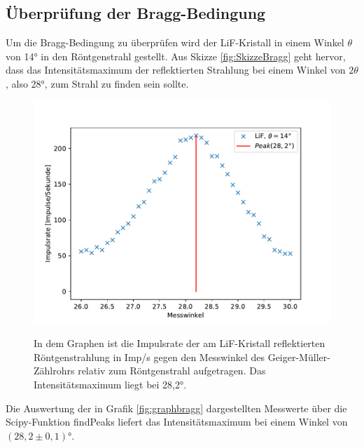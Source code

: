 \documentclass[titlepage = firstcover]{scrartcl}
\begin{document}
        \subsection{Überprüfung der Bragg-Bedingung}
            Um die Bragg-Bedingung zu überprüfen wird der LiF-Kristall in einem Winkel $\theta$ von 14° in den Röntgenstrahl gestellt. Aus Skizze \ref{fig:SkizzeBragg} geht hervor, dass das 
            Intensitätsmaximum der reflektierten Strahlung bei einem Winkel von $2\theta$, also 28°, zum Strahl zu finden sein sollte.
            \FloatBarrier
            \begin{figure}[h]
              \centering
              \caption{In dem Graphen ist die Impulsrate der am LiF-Kristall reflektierten Röntgenstrahlung in Imp/s gegen den Messwinkel des Geiger-Müller-Zählrohrs relativ zum Röntgenstrahl aufgetragen. Das Intensitätsmaximum liegt bei 28,2°.}
              \includegraphics{Bragg.pdf}
              \label{fig:bragggraph}
            \end{figure}
            \FloatBarrier  

            \noindent
            Die Auswertung der in Grafik \ref{fig:graphbragg} dargestellten Messwerte über die Scipy-Funktion findPeaks liefert das Intensitätsmaximum bei einem Winkel von $(28,2 \pm 0,1)°$. 
\end{document}
